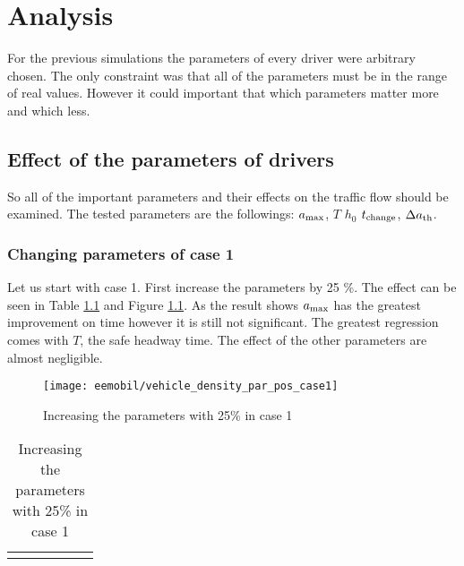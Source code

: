 \chapter{Analysis}
		For the previous simulations the parameters of every driver were arbitrary chosen. The only constraint was that all of the parameters must be in the range of real values. However it could important that which parameters matter more and which less.
	\section{Effect of the parameters of drivers}
		So all of the important parameters and their effects on the traffic flow should be examined. The tested parameters are the followings: $a_{\rm max}$, $T$ $h_0$ $t_{\rm change} $, $\Delta  a_{\rm th}$.
		\subsection{Changing parameters of case 1}
		Let us start with case 1. First increase the parameters by 25 \%. The effect can be seen in Table \ref{tab:vehicle_density_par_pos_case_1} and Figure \ref{fig:vehicle_density_par_pos_case_1}. As the result shows $a_{\rm max}$ has the greatest improvement on time however it is still not significant. The greatest regression comes with $T$, the safe headway time. The effect of the other parameters are almost negligible.
		\begin{figure}[ht]
			\centering
			\texttt{[image: eemobil/vehicle\_density\_par\_pos\_case1]}
			\caption{Increasing the parameters with 25\% in case 1}
			\label{fig:vehicle_density_par_pos_case_1}
		\end{figure}
		\begin{table}[ht]
			\begin{center}
				\begin{tabular}{ |c|c|c|c|c|c|}
				\hline
				\vehicledensitypartable{1}
				\hline
				\end{tabular}
			\end{center}
			\caption{Increasing the parameters with 25\% in case 1}
			\label{tab:vehicle_density_par_pos_case_1}
		\end{table}
		
